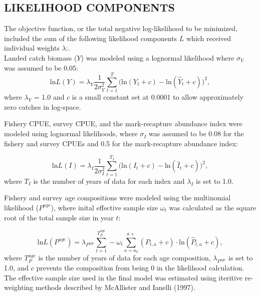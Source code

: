 \documentclass[
]{article}
\begin{document}
\hypertarget{likelihood-components}{%
\subsection{LIKELIHOOD COMPONENTS}\label{likelihood-components}}

The objective function, or the total negative log-likelihood to be minimized, included the sum of the following likelihood components \(L\) which received individual weights \(\lambda\):.\\

Landed catch biomass (\(Y\)) was modeled using a lognormal likelihood where \(\sigma_Y\) was assumed to be 0.05: \[
\begin{equation}
\mbox{ln}L(Y)=\lambda_Y\frac{1}{2\sigma_Y^2}\sum_{t=1}^{T}\Big(\mbox{ln}(Y_t+c)-\mbox{ln}(\hat{Y}_t+c)\Big)^2 ,
\label{eq:catchlike}
\end{equation} 
\]
where \(\lambda_Y\) = 1.0 and \(c\) is a small constant set at 0.0001 to allow approximately zero catches in log-space.

Fishery CPUE, survey CPUE, and the mark-recapture abundance index were modeled using lognormal likelihoods, where \(\sigma_I\) was assumed to be 0.08 for the fishery and survey CPUEs and 0.5 for the mark-recapture abundance index:

\[
\begin{equation}
\mbox{ln}L(I)=\lambda_I\frac{1}{2\sigma_I^2}\sum_{t=1}^{T_I}\Big(\mbox{ln}(I_t+c)-\mbox{ln}(\hat{I}_t+c)\Big)^2 ,
\label{eq:indexlike}
\end{equation} 
\]
where \(T_I\) is the number of years of data for each index and \(\lambda_I\) is set to 1.0.

Fishery and survey age compositions were modeled using the multinomial likelihood (\(P^{age}\)), where inital effective sample size \(\omega_t\) was calculated as the square root of the total sample size in year \(t\):

\[
\begin{equation}
\mbox{ln}L(P^{age})=\lambda_{P^{age}}\sum_{t=1}^{T_P^{age}} - \omega_t \sum_{a=a_0}^{a+} (P_{t,a}+c)\cdot\mbox{ln}(\hat{P}_{t,a}+c),
\label{eq:agemult}
\end{equation} 
\]
where \(T_P^{age}\) is the number of years of data for each age composition, \(\lambda_{P^{age}}\) is set to 1.0, and \(c\) prevents the composition from being 0 in the likelihood calculation. The effective sample size used in the final model was estimated using iteritive re-weighting methods described by McAllister and Ianelli (1997).
\end{document}
